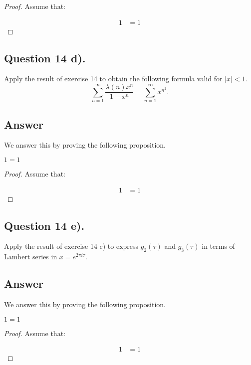 \begin{proof}
    Assume that:

    \begin{align*}
        1 &= 1
    \end{align*}

\end{proof}


\subsection{Question 14 d).}
\noindent
Apply the result of exercise 14 to obtain the following formula valid for $|x|<1$.
\[
    \sum_{n=1}^{\infty} \frac{\lambda(n) x^n}{1-x^n} = \sum_{n=1}^{\infty} x^{n^2}.
\]

\subsection*{Answer}
\noindent
We answer this by proving the following proposition.

\begin{proposition}
    $1=1$
\end{proposition}

\begin{proof}
    Assume that:

    \begin{align*}
        1 &= 1
    \end{align*}

\end{proof}


\subsection{Question 14 e).}
\noindent
Apply the result of exercise 14 c) to express $g_2(\tau)$ and $g_3(\tau)$ in terms of Lambert series in
$x=e^{2\pi i \tau}$.

\subsection*{Answer}
\noindent
We answer this by proving the following proposition.

\begin{proposition}
    $1=1$
\end{proposition}

\begin{proof}
    Assume that:

    \begin{align*}
        1 &= 1
    \end{align*}

\end{proof}



